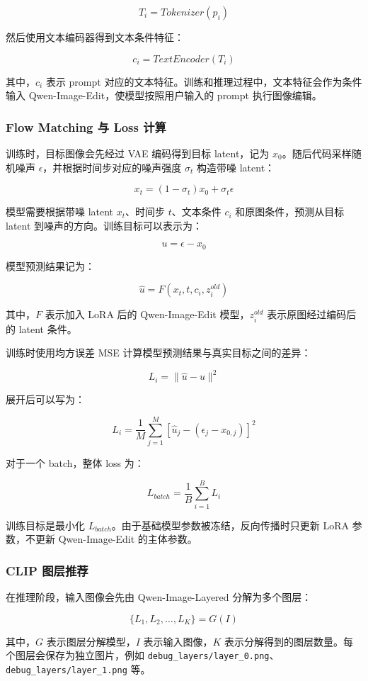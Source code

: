 \documentclass[UTF8,11pt,a4paper,fontset=fandol]{ctexart}
\begin{document}
\[
T_i = Tokenizer(p_i)
\]

然后使用文本编码器得到文本条件特征：

\[
c_i = TextEncoder(T_i)
\]

其中，\(c_i\) 表示 prompt 对应的文本特征。训练和推理过程中，文本特征会作为条件输入 Qwen-Image-Edit，使模型按照用户输入的 prompt 执行图像编辑。

\subsubsection{Flow Matching 与 Loss 计算}

训练时，目标图像会先经过 VAE 编码得到目标 latent，记为 \(x_0\)。随后代码采样随机噪声 \(\epsilon\)，并根据时间步对应的噪声强度 \(\sigma_t\) 构造带噪 latent：

\[
x_t = (1 - \sigma_t)x_0 + \sigma_t \epsilon
\]

模型需要根据带噪 latent \(x_t\)、时间步 \(t\)、文本条件 \(c_i\) 和原图条件，预测从目标 latent 到噪声的方向。训练目标可以表示为：

\[
u = \epsilon - x_0
\]

模型预测结果记为：

\[
\hat{u} = F(x_t, t, c_i, z_i^{old})
\]

其中，\(F\) 表示加入 LoRA 后的 Qwen-Image-Edit 模型，\(z_i^{old}\) 表示原图经过编码后的 latent 条件。

训练时使用均方误差 MSE 计算模型预测结果与真实目标之间的差异：

\[
L_i = \|\hat{u} - u\|^2
\]

展开后可以写为：

\[
L_i = \frac{1}{M}\sum_{j=1}^{M}
\left[
\hat{u}_j - (\epsilon_j - x_{0,j})
\right]^2
\]

对于一个 batch，整体 loss 为：

\[
L_{batch} = \frac{1}{B}\sum_{i=1}^{B}L_i
\]

训练目标是最小化 \(L_{batch}\)。由于基础模型参数被冻结，反向传播时只更新 LoRA 参数，不更新 Qwen-Image-Edit 的主体参数。

\subsubsection{CLIP 图层推荐}

在推理阶段，输入图像会先由 Qwen-Image-Layered 分解为多个图层：

\[
\{L_1, L_2, \ldots, L_K\} = G(I)
\]

其中，\(G\) 表示图层分解模型，\(I\) 表示输入图像，\(K\) 表示分解得到的图层数量。每个图层会保存为独立图片，例如 \texttt{debug\_layers/layer\_0.png}、\texttt{debug\_layers/layer\_1.png} 等。
\end{document}
